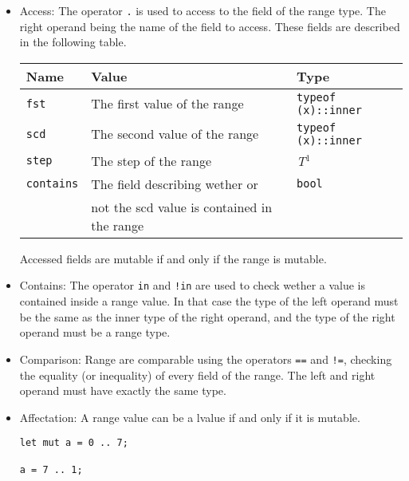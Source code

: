 \begin{itemize}
\item Access: The operator \texttt{.} is used to access to the field of the
  range type. The right operand being the name of the field to access. These
  fields are described in the following table.

  \vspace{-20pt}%
  \begin{center}\begin{adjustbox}{max width=\linewidth}
    \begin{threeparttable}
      \begin{tabular}{|l|ll|}
        \hline
        Name & Value & Type\\
        \hline
        \hline
        \texttt {fst} & The first value of the range & \texttt{typeof (x)::inner} \\
        \texttt {scd} & The second value of the range & \texttt{typeof (x)::inner} \\
        \texttt {step} & The step of the range & \textit{T}$^{1^{\phantom{j}}}$ \\
        \texttt {contains} & The field describing wether or  & \texttt{bool} \\
        & not the scd value is contained in the range &\\
        \hline
      \end{tabular}
    \end{threeparttable}
\end{adjustbox}\end{center}

Accessed fields are mutable if and only if the range is mutable.

\item Contains: The operator \texttt{in} and \texttt{!in} are used to check
  wether a value is contained inside a range value. In that case the type of the
  left operand must be the same as the inner type of the right operand, and the
  type of the right operand must be a range type.

\item Comparison: Range are comparable using the operators \texttt{==} and
  \texttt{!=}, checking the equality (or inequality) of every field of the
  range. The left and right operand must have exactly the same type.

\item Affectation: A range value can be a lvalue if and only if it is mutable.
  \begin{lstlisting}[style=coloredverbatim]
let mut a = 0 .. 7;

a = 7 .. 1;
  \end{lstlisting}

\end{itemize}

